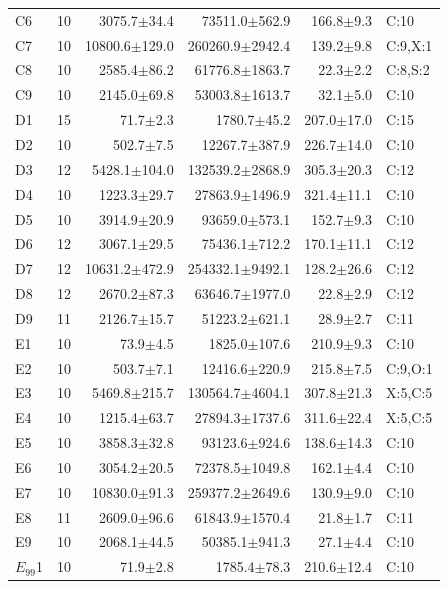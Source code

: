\begin{supertabular}{@{}lrrrrl@{}}
C6 & 10 & 3075.7$\pm$34.4 & 73511.0$\pm$562.9 & 166.8$\pm$9.3 & C:10 \\
C7 & 10 & 10800.6$\pm$129.0 & 260260.9$\pm$2942.4 & 139.2$\pm$9.8 & C:9,X:1 \\
C8 & 10 & 2585.4$\pm$86.2 & 61776.8$\pm$1863.7 & 22.3$\pm$2.2 & C:8,S:2 \\
C9 & 10 & 2145.0$\pm$69.8 & 53003.8$\pm$1613.7 & 32.1$\pm$5.0 & C:10 \\
D1 & 15 & 71.7$\pm$2.3 & 1780.7$\pm$45.2 & 207.0$\pm$17.0 & C:15 \\
D2 & 10 & 502.7$\pm$7.5 & 12267.7$\pm$387.9 & 226.7$\pm$14.0 & C:10 \\
D3 & 12 & 5428.1$\pm$104.0 & 132539.2$\pm$2868.9 & 305.3$\pm$20.3 & C:12 \\
D4 & 10 & 1223.3$\pm$29.7 & 27863.9$\pm$1496.9 & 321.4$\pm$11.1 & C:10 \\
D5 & 10 & 3914.9$\pm$20.9 & 93659.0$\pm$573.1 & 152.7$\pm$9.3 & C:10 \\
D6 & 12 & 3067.1$\pm$29.5 & 75436.1$\pm$712.2 & 170.1$\pm$11.1 & C:12 \\
D7 & 12 & 10631.2$\pm$472.9 & 254332.1$\pm$9492.1 & 128.2$\pm$26.6 & C:12 \\
D8 & 12 & 2670.2$\pm$87.3 & 63646.7$\pm$1977.0 & 22.8$\pm$2.9 & C:12 \\
D9 & 11 & 2126.7$\pm$15.7 & 51223.2$\pm$621.1 & 28.9$\pm$2.7 & C:11 \\
E1 & 10 & 73.9$\pm$4.5 & 1825.0$\pm$107.6 & 210.9$\pm$9.3 & C:10 \\
E2 & 10 & 503.7$\pm$7.1 & 12416.6$\pm$220.9 & 215.8$\pm$7.5 & C:9,O:1 \\
E3 & 10 & 5469.8$\pm$215.7 & 130564.7$\pm$4604.1 & 307.8$\pm$21.3 & X:5,C:5 \\
E4 & 10 & 1215.4$\pm$63.7 & 27894.3$\pm$1737.6 & 311.6$\pm$22.4 & X:5,C:5 \\
E5 & 10 & 3858.3$\pm$32.8 & 93123.6$\pm$924.6 & 138.6$\pm$14.3 & C:10 \\
E6 & 10 & 3054.2$\pm$20.5 & 72378.5$\pm$1049.8 & 162.1$\pm$4.4 & C:10 \\
E7 & 10 & 10830.0$\pm$91.3 & 259377.2$\pm$2649.6 & 130.9$\pm$9.0 & C:10 \\
E8 & 11 & 2609.0$\pm$96.6 & 61843.9$\pm$1570.4 & 21.8$\pm$1.7 & C:11 \\
E9 & 10 & 2068.1$\pm$44.5 & 50385.1$\pm$941.3 & 27.1$\pm$4.4 & C:10 \\
$E_{99}$1 & 10 & 71.9$\pm$2.8 & 1785.4$\pm$78.3 & 210.6$\pm$12.4 & C:10 \\

\end{supertabular}
